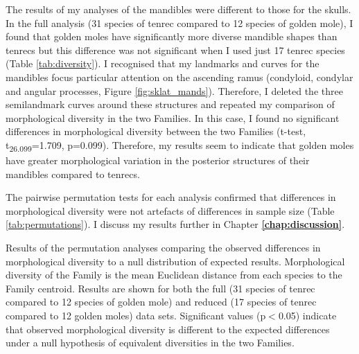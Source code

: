 	The results of my analyses of the mandibles were different to those for the skulls. In the full analysis (31 species of tenrec compared to 12 species of golden mole), I found that golden moles have significantly more diverse mandible shapes than tenrecs but this difference was not significant when I used just 17 tenrec species (Table \ref{tab:diversity}). I recognised that my landmarks and curves for the mandibles focus particular attention on the ascending ramus (condyloid, condylar and angular processes, Figure \ref{fig:sklat_mands}). Therefore, I  deleted the three semilandmark curves around these structures and repeated my comparison of morphological diversity in the two Families. In this case, I found no significant differences in morphological diversity between the two Families (t-test, t\textsubscript{26.099}=1.709, p=0.099). Therefore, my results seem to indicate that golden moles have greater morphological variation in the posterior structures of their mandibles compared to tenrecs.
	
	The pairwise permutation tests for each analysis confirmed that differences in morphological diversity were not artefacts of differences in sample size (Table \ref{tab:permutations}). I discuss my results further in Chapter \textbf{\ref{chap:discussion}}.

\begin{landscape}
\begin{table}[!htbp]			
	\caption[Results of the permutation tests]{Results of the permutation analyses comparing the observed differences in morphological diversity to a null distribution of expected results. Morphological diversity of the Family is the mean Euclidean distance from each species to the Family centroid. Results are shown for both the full (31 species of tenrec compared to 12 species of golden mole) and reduced (17 species of tenrec compared to 12 golden moles) data sets. Significant values (p$<$0.05) indicate that observed morphological diversity is different to the expected differences under a null hypothesis of equivalent diversities in the two Families.}
	 
	\label{tab:permutations}  
\end{table}
\end{landscape}


	






